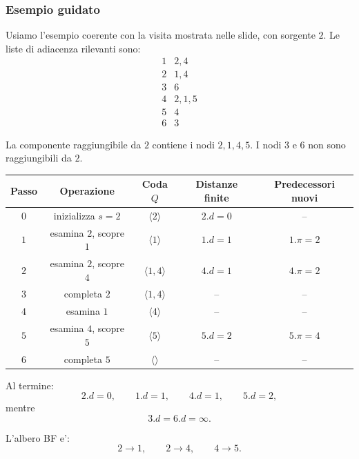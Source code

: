 \subsubsection{Esempio guidato}
Usiamo l'esempio coerente con la visita mostrata nelle slide, con sorgente $2$.
Le liste di adiacenza rilevanti sono:
\[
\begin{array}{c|l}
1 & 2,4 \\
2 & 1,4 \\
3 & 6 \\
4 & 2,1,5 \\
5 & 4 \\
6 & 3
\end{array}
\]

La componente raggiungibile da $2$ contiene i nodi $2,1,4,5$. I nodi $3$ e $6$ non sono raggiungibili da $2$.

\begin{center}
\begin{tabular}{c|c|c|c|c}
\toprule
Passo & Operazione & Coda $Q$ & Distanze finite & Predecessori nuovi \\
\midrule
$0$ & inizializza $s=2$ & $\langle 2\rangle$ & $2.d=0$ & -- \\
$1$ & esamina $2$, scopre $1$ & $\langle 1\rangle$ & $1.d=1$ & $1.\pi=2$ \\
$2$ & esamina $2$, scopre $4$ & $\langle 1,4\rangle$ & $4.d=1$ & $4.\pi=2$ \\
$3$ & completa $2$ & $\langle 1,4\rangle$ & -- & -- \\
$4$ & esamina $1$ & $\langle 4\rangle$ & -- & -- \\
$5$ & esamina $4$, scopre $5$ & $\langle 5\rangle$ & $5.d=2$ & $5.\pi=4$ \\
$6$ & completa $5$ & $\langle\rangle$ & -- & -- \\
\bottomrule
\end{tabular}
\end{center}

Al termine:
\[
2.d=0,\qquad 1.d=1,\qquad 4.d=1,\qquad 5.d=2,
\]
mentre
\[
3.d=6.d=\infty.
\]

L'albero BF e':
\[
2\to 1,\qquad 2\to 4,\qquad 4\to 5.
\]

